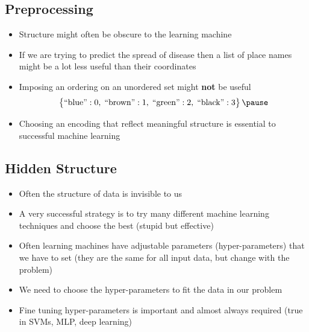 
\begin{slide}
\section{Preprocessing}

\begin{PauseHighLight}
  \begin{itemize}
  \item Structure might often be obscure to the learning machine\pause
  \item If we are trying to predict the spread of disease then a list
    of place names might be a lot less useful than their
    coordinates\pause
  \item Imposing an ordering on an unordered set might \textbf{not} be useful
    \begin{align*}
      \left\{\strut \text{``blue''}:0,\;\text{``brown''}:1,\;
      \text{``green''}:2,\;\text{``black''}:3 \right\}\pause
    \end{align*}
  \item Choosing an encoding that reflect meaningful structure is
    essential to successful machine learning\pause
  \end{itemize}
\end{PauseHighLight}

\end{slide}

\Outline %

\begin{slide}
  \section{Hidden Structure}

  \begin{PauseHighLight}
    \begin{itemize}
    \item Often the structure of data is invisible to us\pause
    \item A very successful strategy is to try many different machine
      learning techniques and choose the best\pause{} (stupid but
      effective)\pauseb
    \item Often learning machines have adjustable parameters
      (hyper-parameters) that we have to set (they are the same for
      all input data, but change with the problem)\pause
    \item We need to choose the hyper-parameters to fit the data in
      our problem\pause
    \item Fine tuning hyper-parameters is important\pause{} and almost always
      required (true in SVMs, MLP, deep learning)\pauseb
    \end{itemize}
  \end{PauseHighLight}

\end{slide}

